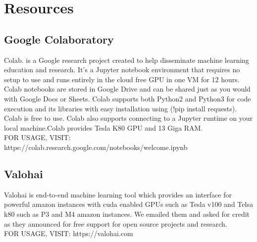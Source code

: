 \section{Resources}
\label{chap:Resources}

\subsection{Google Colaboratory}
Colab. is a Google research project created to help disseminate machine learning education and research. It's a Jupyter notebook environment that requires no setup to use and runs entirely in the cloud free GPU in one VM for 12 hours. Colab notebooks are stored in Google Drive and can be shared just as you would with Google Docs or Sheets. Colab supports both Python2 and Python3 for code execution and its libraries with easy installation using (!pip install requests). Colab is free to use. Colab also supports connecting to a Jupyter runtime on your local machine.Colab provides Tesla K80 GPU and 13 Giga RAM.\\FOR USAGE, VISIT: https://colab.research.google.com/notebooks/welcome.ipynb
\subsection{Valohai}
Valohai is end-to-end machine learning tool which provides an interface for powerful amazon instances with cuda enabled GPUs such as Tesla v100 and Telsa k80 such as P3 and M4 amazon instances.
We emailed them and asked for credit as they announced for free support for open source projects and research.\\
FOR USAGE, VISIT: https://valohai.com
